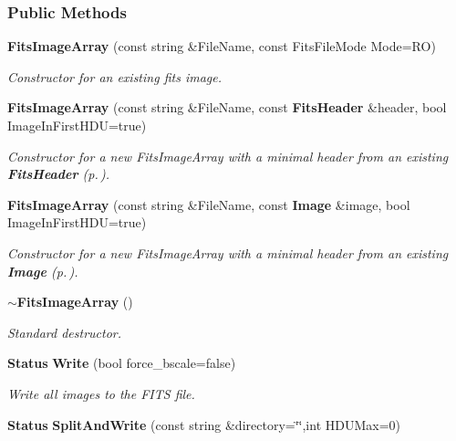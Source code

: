 \subsubsection*{Public Methods}
\begin{CompactItemize}
\item 
{\bf Fits\-Image\-Array} (const string \&File\-Name, const Fits\-File\-Mode Mode=RO)
\begin{CompactList}\small\item\em Constructor for an existing fits image.\item\end{CompactList}\item 
{\bf Fits\-Image\-Array} (const string \&File\-Name, const {\bf Fits\-Header} \&header, bool Image\-In\-First\-HDU=true)
\begin{CompactList}\small\item\em Constructor for a new Fits\-Image\-Array with a minimal header from an existing {\bf Fits\-Header} {\rm (p.\,\pageref{class_fitsheader})}.\item\end{CompactList}\item 
{\bf Fits\-Image\-Array} (const string \&File\-Name, const {\bf Image} \&image, bool Image\-In\-First\-HDU=true)
\begin{CompactList}\small\item\em Constructor for a new Fits\-Image\-Array with a minimal header from an existing {\bf Image} {\rm (p.\,\pageref{class_image})}.\item\end{CompactList}\item 
{}
{\bf $\sim$Fits\-Image\-Array} ()\label{class_fitsimagearray_a3}

\begin{CompactList}\small\item\em Standard destructor.\item\end{CompactList}\item 
{}
{\bf Status} {\bf Write} (bool force\_\-bscale=false)\label{class_fitsimagearray_a4}

\begin{CompactList}\small\item\em Write all images to the FITS file.\item\end{CompactList}\item 
{}
{\bf Status} {\bf Split\-And\-Write} (const string \&directory=\char`\"{}\char`\"{},int HDUMax=0)\label{class_fitsimagearray_a5}


\end{CompactItemize}
